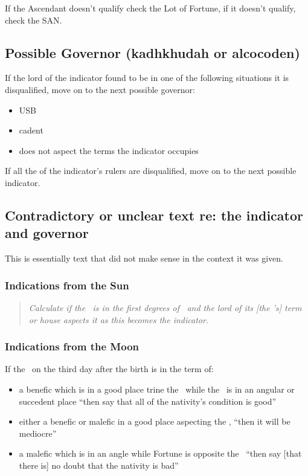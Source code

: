 If  the Ascendant doesn't qualify check the Lot of Fortune, if it doesn't qualify, check the SAN.

\vspace{-0.5em}
\subsection{Possible Governor (kadhkhudah or alcocoden)}
If the lord of the indicator found to be in one of the following situations  it is disqualified, move on to the next possible governor:

\begin{itemize}[topsep=0em, itemsep=0em]
\item {} USB
\item {} cadent
\item {} does not aspect the terms the indicator occupies
\end{itemize}

If all the of the indicator's rulers are disqualified, move on to the next possible indicator.
\newpage
\subsection{Contradictory or unclear text re: the indicator and governor}
\begin{mdframed}[backgroundcolor=cyan!5, rightmargin=1em, leftmargin=1em]
This is essentially text that did not make sense in the context it was given. 
\end{mdframed}

\subsubsection{Indications from the Sun}
\begin{quote}
\textsl{Calculate if the \Sun\, is in the first degrees of \Aries\, and the lord of its [the \Sun's] term or house aspects it as this becomes the indicator.}
\end{quote}

\subsubsection{Indications from the Moon}
If  the \Moon\, on the third day after the birth is in the term of:

\begin{itemize}[topsep=0em,itemsep=0em]
\item a benefic which is in a good place trine the \Moon\, while the \Moon\, is in an angular or succedent place ``then say that all of the nativity's condition is good''

\item either  a benefic or malefic in a good place aspecting the \Moon, ``then it will be mediocre''

\item a  malefic which is in an angle while Fortune is opposite the \Moon\, ``then say [that there is] no doubt that the nativity is bad''
\end{itemize}

